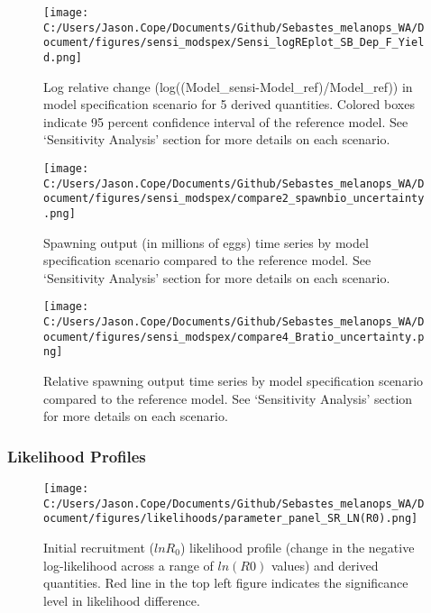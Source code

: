 \documentclass[11pt,
  english,
  letterpaper,
]{article}
\begin{document}
\pagebreak

\begin{figure}
\centering
\texttt{[image: C:/Users/Jason.Cope/Documents/Github/Sebastes\_melanops\_WA/Document/figures/sensi\_modspex/Sensi\_logREplot\_SB\_Dep\_F\_Yield.png]}
\caption{Log relative change (log((Model\_sensi-Model\_ref)/Model\_ref)) in model specification scenario for 5 derived quantities. Colored boxes indicate 95 percent confidence interval of the reference model. See `Sensitivity Analysis' section for more details on each scenario.\label{fig:sensi-modspec-RE}}
\end{figure}

\pagebreak

\begin{figure}
\centering
\texttt{[image: C:/Users/Jason.Cope/Documents/Github/Sebastes\_melanops\_WA/Document/figures/sensi\_modspex/compare2\_spawnbio\_uncertainty.png]}
\caption{Spawning output (in millions of eggs) time series by model specification scenario compared to the reference model. See `Sensitivity Analysis' section for more details on each scenario.\label{fig:sensi-modspec-ssb}}
\end{figure}

\pagebreak

\begin{figure}
\centering
\texttt{[image: C:/Users/Jason.Cope/Documents/Github/Sebastes\_melanops\_WA/Document/figures/sensi\_modspex/compare4\_Bratio\_uncertainty.png]}
\caption{Relative spawning output time series by model specification scenario compared to the reference model. See `Sensitivity Analysis' section for more details on each scenario.\label{fig:sensi-modspec-depl}}
\end{figure}

\pagebreak

\hypertarget{likelihood-profiles-1}{%
\subsubsection{Likelihood Profiles}\label{likelihood-profiles-1}}

\begin{figure}
\centering
\texttt{[image: C:/Users/Jason.Cope/Documents/Github/Sebastes\_melanops\_WA/Document/figures/likelihoods/parameter\_panel\_SR\_LN(R0).png]}
\caption{Initial recruitment (\(lnR_0\)) likelihood profile (change in the negative log-likelihood across a range of \(ln(R0)\) values) and derived quantities. Red line in the top left figure indicates the significance level in likelihood difference.\label{fig:R0-profile}}
\end{figure}
\end{document}

